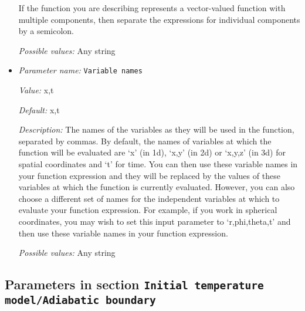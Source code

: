 \begin{itemize}
If the function you are describing represents a vector-valued function with multiple components, then separate the expressions for individual components by a semicolon.


{\it Possible values:} Any string
\item {\it Parameter name:} {\tt Variable names}
\label{parameters:Initial temperature model/Adiabatic/Function/Variable names}
\label{parameters:Initial_20temperature_20model/Adiabatic/Function/Variable_20names}


{\it Value:} x,t


{\it Default:} x,t


{\it Description:} The names of the variables as they will be used in the function, separated by commas. By default, the names of variables at which the function will be evaluated are `x' (in 1d), `x,y' (in 2d) or `x,y,z' (in 3d) for spatial coordinates and `t' for time. You can then use these variable names in your function expression and they will be replaced by the values of these variables at which the function is currently evaluated. However, you can also choose a different set of names for the independent variables at which to evaluate your function expression. For example, if you work in spherical coordinates, you may wish to set this input parameter to `r,phi,theta,t' and then use these variable names in your function expression.


{\it Possible values:} Any string
\end{itemize}

\subsection{Parameters in section \tt Initial temperature model/Adiabatic boundary}
\label{parameters:Initial_20temperature_20model/Adiabatic_20boundary}

